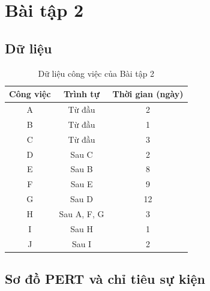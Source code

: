 \section{Bài tập 2}

\subsection{Dữ liệu}

\begin{table}[H]\centering
\caption{Dữ liệu công việc của Bài tập 2}
\begin{tabular}{c c c}
\toprule
\textbf{Công việc} & \textbf{Trình tự} & \textbf{Thời gian (ngày)}\\
\midrule
A & Từ đầu & 2\\
B & Từ đầu & 1\\
C & Từ đầu & 3\\
D & Sau C & 2\\
E & Sau B & 8\\
F & Sau E & 9\\
G & Sau D & 12\\
H & Sau A, F, G & 3\\
I & Sau H & 1\\
J & Sau I & 2\\
\bottomrule
\end{tabular}
\end{table}

\subsection{Sơ đồ PERT và chỉ tiêu sự kiện}

